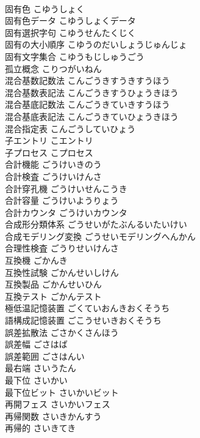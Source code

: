\documentclass[8pt]{extreport}
\begin{document}
\begin{CJK}{UTF8}{min}
\\	固有色	こゆうしょく	
\\	固有色データ	こゆうしょくデータ	
\\	固有選択字句	こゆうせんたくじく	
\\	固有の大小順序	こゆうのだいしょうじゅんじょ	
\\	固有文字集合	こゆうもじしゅうごう	
\\	孤立概念	こりつがいねん	
\\	混合基数記数法	こんごうきすうきすうほう	
\\	混合基数表記法	こんごうきすうひょうきほう	
\\	混合基底記数法	こんごうきていきすうほう	
\\	混合基底表記法	こんごうきていひょうきほう	
\\	混合指定表	こんごうしていひょう	
\\	子エントリ	こエントリ	
\\	子プロセス	こプロセス	
\\	合計機能	ごうけいきのう	
\\	合計検査	ごうけいけんさ	
\\	合計穿孔機	ごうけいせんこうき	
\\	合計容量	ごうけいようりょう	
\\	合計カウンタ	ごうけいカウンタ	
\\	合成形分類体系	ごうせいがたぶんるいたいけい	
\\	合成モデリング変換	ごうせいモデリングへんかん	
\\	合理性検査	ごうりせいけんさ	
\\	互換機	ごかんき	
\\	互換性試験	ごかんせいしけん	
\\	互換製品	ごかんせいひん	
\\	互換テスト	ごかんテスト	
\\	極低温記憶装置	ごくていおんきおくそうち	
\\	語構成記憶装置	ごこうせいきおくそうち	
\\	誤差拡散法	ごさかくさんほう	
\\	誤差幅	ごさはば	
\\	誤差範囲	ごさはんい	
\\	最右端	さいうたん	
\\	最下位	さいかい	
\\	最下位ビット	さいかいビット	
\\	再開フェス	さいかいフェス	
\\	再帰関数	さいきかんすう	
\\	再帰的	さいきてき	

\end{CJK}
\end{document}
